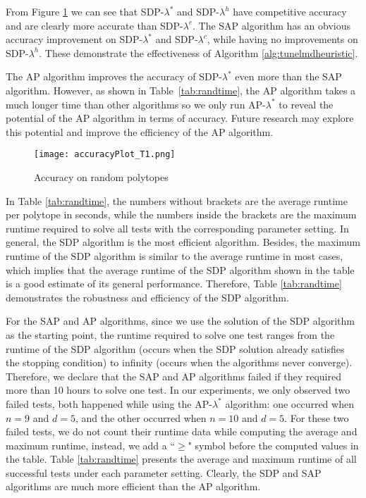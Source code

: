 \documentclass[smallextended, envcountsame]{svjour3}
\begin{document}
    From Figure \ref{fig:randacc} we can see that SDP-$\lambda^*$ and SDP-$\lambda^h$ have competitive accuracy and are clearly more accurate than SDP-$\lambda^c$.  The SAP algorithm has an obvious accuracy improvement on SDP-$\lambda^*$ and SDP-$\lambda^c$, while having no improvements on SDP-$\lambda^h$.  These demonstrate the effectiveness of Algorithm \ref{alg:tunelmdheuristic}.
    
    The AP algorithm improves the accuracy of SDP-$\lambda^*$ even more than the SAP algorithm.  However, as shown in Table~\ref{tab:randtime}, the AP algorithm takes a much longer time than other algorithms so we only run AP-$\lambda^*$ to reveal the potential of the AP algorithm in terms of accuracy.  Future research may explore this potential and improve the efficiency of the AP algorithm.
    \begin{figure}[!htb]
         \centering
         \texttt{[image: accuracyPlot\_T1.png]}
         \caption{Accuracy on random polytopes}
         \label{fig:randacc}
    \end{figure}\FloatBarrier

    In Table \ref{tab:randtime}, the numbers without brackets are the average runtime per polytope in seconds, while the numbers inside the brackets are the maximum runtime required to solve all tests with the corresponding parameter setting.  In general, the SDP algorithm is the most efficient algorithm.  Besides, the maximum runtime of the SDP algorithm is similar to the average runtime in most cases, which implies that the average runtime of the SDP algorithm shown in the table is a good estimate of its general performance.  Therefore, Table \ref{tab:randtime} demonstrates the robustness and efficiency of the SDP algorithm.
    
    For the SAP and AP algorithms, since we use the solution of the SDP algorithm as the starting point, the runtime required to solve one test ranges from the runtime of the SDP algorithm (occurs when the SDP solution already satisfies the stopping condition) to infinity (occurs when the algorithms never converge).  Therefore, we declare that the SAP and AP algorithms failed if they required more than 10 hours to solve one test.  In our experiments, we only observed two failed tests, both happened while using the AP-$\lambda^*$ algorithm: one occurred when $n=9$ and $d=5$, and the other occurred when $n=10$ and $d=5$.  For these two failed tests, we do not count their runtime data while computing the average and maximum runtime, instead, we add a ``$\ge$" symbol before the computed values in the table.  Table \ref{tab:randtime} presents the average and maximum runtime of all successful tests under each parameter setting.  Clearly, the SDP and SAP algorithms are much more efficient than the AP algorithm.
\end{document}
